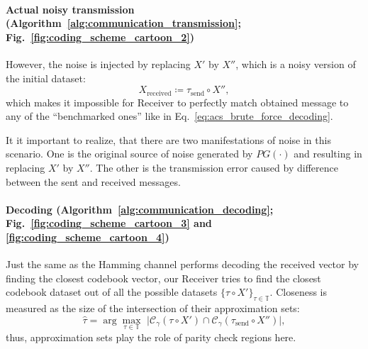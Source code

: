 \paragraph{Actual noisy transmission (Algorithm~\ref{alg:communication_transmission}; 
Fig.~\ref{fig:coding_scheme_cartoon_2})} 
However, the noise is injected by replacing 
$X'$ by $X''$, which is a noisy version of the initial dataset:
\begin{equation}
  X_{\text{received}} \coloneqq \tau_{\text{send}} \circ X'',
\end{equation}
which makes it impossible for Receiver to perfectly match obtained message to
any of the ``benchmarked ones'' like in Eq.~\eqref{eq:acs_brute_force_decoding}.

\parsec
\myremark It it important to realize, that there are two manifestations of noise
in this scenario. One is the original source of noise generated by $PG(\cdot)$ and resulting
in replacing $X'$ by $X''$. The other is the transmission error caused by 
difference between the sent and received messages.

\paragraph{Decoding (Algorithm~\ref{alg:communication_decoding}; Fig.~\ref{fig:coding_scheme_cartoon_3} and
\ref{fig:coding_scheme_cartoon_4})} 
Just the same
as the Hamming channel performs decoding the received vector by finding
the closest codebook vector, our Receiver tries to find the closest codebook 
dataset out of all the possible datasets $\{\tau \circ X'\}_{\tau \in \mathbb{T}}$.
Closeness is measured as the size of the intersection of their approximation sets:
\begin{equation}
  \hat \tau = \arg \max_{\tau \in \mathbb{T}} \,\,
  \bigl| 
     \mathcal{C}_\gamma(\tau \circ X') \cap \mathcal{C}_\gamma(\tau_{\text{send}} \circ X'')
  \bigr|,
\end{equation}
thus, approximation sets play the role of parity check regions here.

